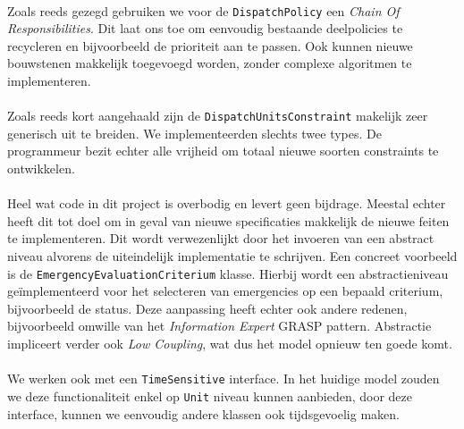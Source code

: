 \paragraph{}
Zoals reeds gezegd gebruiken we voor de \texttt{DispatchPolicy} een \textit{Chain Of Responsibilities}. Dit laat ons toe om eenvoudig bestaande deelpolicies te recycleren en bijvoorbeeld de prioriteit aan te passen. Ook kunnen nieuwe bouwstenen makkelijk toegevoegd worden, zonder complexe algoritmen te implementeren.

\paragraph{}
Zoals reeds kort aangehaald zijn de \texttt{DispatchUnitsConstraint} makelijk zeer generisch uit te breiden. We implementeerden slechts twee types. De programmeur bezit echter alle vrijheid om totaal nieuwe soorten constraints te ontwikkelen.
\paragraph{}
Heel wat code in dit project is overbodig en levert geen bijdrage. Meestal echter heeft dit tot doel om in geval van nieuwe specificaties makkelijk de nieuwe feiten te implementeren. Dit wordt verwezenlijkt door het invoeren van een abstract niveau alvorens de uiteindelijk implementatie te schrijven. Een concreet voorbeeld is de \texttt{Emergency\-Evaluation\-Criterium} klasse. Hierbij wordt een abstractieniveau ge\"implementeerd voor het selecteren van emergencies op een bepaald criterium, bijvoorbeeld de status. Deze aanpassing heeft echter ook andere redenen, bijvoorbeeld omwille van het \textit{Information Expert} GRASP pattern. Abstractie impliceert verder ook \textit{Low Coupling}, wat dus het model opnieuw ten goede komt.
\paragraph{}
We werken ook met een \texttt{TimeSensitive} interface. In het huidige model zouden we deze functionaliteit enkel op \texttt{Unit} niveau kunnen aanbieden, door deze interface, kunnen we eenvoudig andere klassen ook tijdsgevoelig maken.